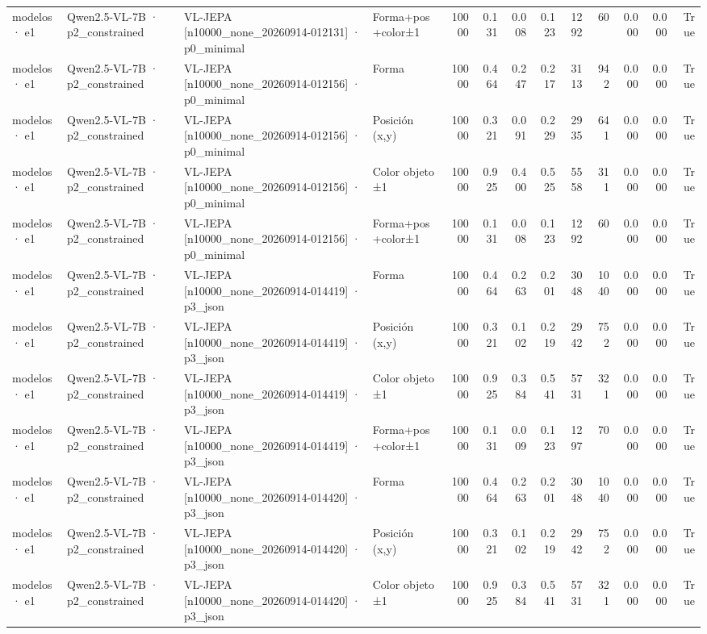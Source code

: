 \begin{tabular}{llllrrrrrrrrr}
modelos · e1 & Qwen2.5-VL-7B · p2\_constrained & VL-JEPA [n10000\_none\_20260914-012131] · p0\_minimal & Forma+pos+color±1 & 10000 & 0.131 & 0.008 & 0.123 & 1292 & 60 & 0.000 & 0.000 & True \\
modelos · e1 & Qwen2.5-VL-7B · p2\_constrained & VL-JEPA [n10000\_none\_20260914-012156] · p0\_minimal & Forma & 10000 & 0.464 & 0.247 & 0.217 & 3113 & 942 & 0.000 & 0.000 & True \\
modelos · e1 & Qwen2.5-VL-7B · p2\_constrained & VL-JEPA [n10000\_none\_20260914-012156] · p0\_minimal & Posición (x,y) & 10000 & 0.321 & 0.091 & 0.229 & 2935 & 641 & 0.000 & 0.000 & True \\
modelos · e1 & Qwen2.5-VL-7B · p2\_constrained & VL-JEPA [n10000\_none\_20260914-012156] · p0\_minimal & Color objeto ±1 & 10000 & 0.925 & 0.400 & 0.525 & 5558 & 311 & 0.000 & 0.000 & True \\
modelos · e1 & Qwen2.5-VL-7B · p2\_constrained & VL-JEPA [n10000\_none\_20260914-012156] · p0\_minimal & Forma+pos+color±1 & 10000 & 0.131 & 0.008 & 0.123 & 1292 & 60 & 0.000 & 0.000 & True \\
modelos · e1 & Qwen2.5-VL-7B · p2\_constrained & VL-JEPA [n10000\_none\_20260914-014419] · p3\_json & Forma & 10000 & 0.464 & 0.263 & 0.201 & 3048 & 1040 & 0.000 & 0.000 & True \\
modelos · e1 & Qwen2.5-VL-7B · p2\_constrained & VL-JEPA [n10000\_none\_20260914-014419] · p3\_json & Posición (x,y) & 10000 & 0.321 & 0.102 & 0.219 & 2942 & 752 & 0.000 & 0.000 & True \\
modelos · e1 & Qwen2.5-VL-7B · p2\_constrained & VL-JEPA [n10000\_none\_20260914-014419] · p3\_json & Color objeto ±1 & 10000 & 0.925 & 0.384 & 0.541 & 5731 & 321 & 0.000 & 0.000 & True \\
modelos · e1 & Qwen2.5-VL-7B · p2\_constrained & VL-JEPA [n10000\_none\_20260914-014419] · p3\_json & Forma+pos+color±1 & 10000 & 0.131 & 0.009 & 0.123 & 1297 & 70 & 0.000 & 0.000 & True \\
modelos · e1 & Qwen2.5-VL-7B · p2\_constrained & VL-JEPA [n10000\_none\_20260914-014420] · p3\_json & Forma & 10000 & 0.464 & 0.263 & 0.201 & 3048 & 1040 & 0.000 & 0.000 & True \\
modelos · e1 & Qwen2.5-VL-7B · p2\_constrained & VL-JEPA [n10000\_none\_20260914-014420] · p3\_json & Posición (x,y) & 10000 & 0.321 & 0.102 & 0.219 & 2942 & 752 & 0.000 & 0.000 & True \\
modelos · e1 & Qwen2.5-VL-7B · p2\_constrained & VL-JEPA [n10000\_none\_20260914-014420] · p3\_json & Color objeto ±1 & 10000 & 0.925 & 0.384 & 0.541 & 5731 & 321 & 0.000 & 0.000 & True \\

\end{tabular}
